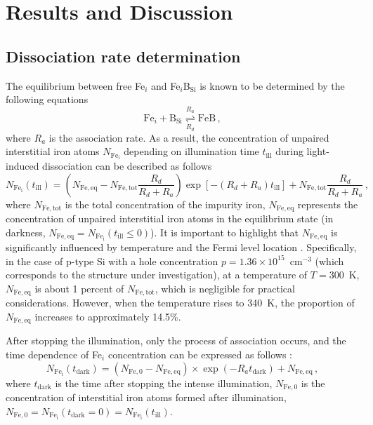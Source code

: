 \documentclass{WileyMSP-template}
\begin{document}
\section{Results and Discussion}

\subsection{Dissociation rate determination}\label{SecR}

The equilibrium between free Fe$_i$ and Fe$_i$B$_\mathrm{Si}$ is known to be determined by the following equations \cite{FeB:kinetic,Sun2021,FeBAssJAP2014}
\begin{equation}
\label{eqReac}
\mathrm{Fe}_i+\mathrm{B}_\mathrm{Si}  \overset{R_a}{\underset{R_d}{\rightleftharpoons{}}} \mathrm{FeB}\,,
\end{equation}
where
$R_a$ is the association rate.
As a result, the concentration of unpaired interstitial iron atoms $N_\mathrm{Fe_i}$ depending on illumination time $t_\mathrm{ill}$
during light-induced dissociation can be described as follows \cite{FeBLight2,FeBKin2019,Olikh2021JAP}
\begin{equation}
\label{eqNfeill}
N_\mathrm{Fe_i}(t_\mathrm{ill})=\left(N_\mathrm{Fe,eq}-N_\mathrm{Fe,tot}
\frac{R_d}{R_d+R_a}\right)\exp[-(R_d+R_a)t_\mathrm{ill}]+N_\mathrm{Fe,tot}\frac{R_d}{R_d+R_a}\,,
\end{equation}
where
$N_\mathrm{Fe,tot}$ is the total concentration of the impurity iron,
$N_\mathrm{Fe,eq}$ represents the concentration of unpaired interstitial iron atoms in the equilibrium state
(in darkness, $N_\mathrm{Fe,eq}=N_\mathrm{Fe_i}(t_\mathrm{ill}\leq0)$).
It is important to highlight that $N_\mathrm{Fe,eq}$ is significantly influenced
by temperature and the Fermi level location \cite{FeB:kinetic}.
Specifically, in the case of p-type Si with a hole concentration $p=1.36\times10^{15}$~cm$^{-3}$
(which corresponds to the structure under investigation),
at a temperature of $T=300$~K, $N_\mathrm{Fe,eq}$ is about 1 percent of $N_\mathrm{Fe,tot}$,
which is negligible for practical considerations.
However, when the temperature rises to 340~K, the proportion of $N_\mathrm{Fe,eq}$ increases to approximately 14.5\%.


After stopping the illumination, only the process of association occurs,
and the time dependence of Fe$_i$ concentration can be expressed as follows \cite{FeB:kinetic,MurphyJAP2011}:
\begin{equation}
\label{eqNFet}
N_\mathrm{Fe_i}(t_\mathrm{dark})=(N_\mathrm{Fe,0}-N_\mathrm{Fe,eq})\times
\exp(-R_a t_\mathrm{dark})+N_\mathrm{Fe,eq}\,,
\end{equation}
where $t_\mathrm{dark}$ is the time after stopping the intense illumination,
$N_\mathrm{Fe,0}$ is the concentration of interstitial iron atoms formed after illumination,
$N_\mathrm{Fe,0}=N_\mathrm{Fe_i}(t_\mathrm{dark}=0)=N_\mathrm{Fe_i}(t_\mathrm{ill})$.
\end{document}
